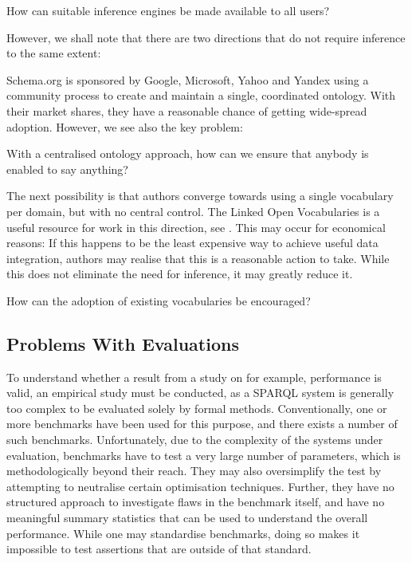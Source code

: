 \begin{problem}%
How can suitable inference engines be made available to all users?
\end{problem}


However, we shall note that there are two directions that do not
require inference to the same extent: 

Schema.org is sponsored by Google, Microsoft, Yahoo and Yandex using a
community process to create and maintain a single, coordinated
ontology. With their market shares, they have a reasonable chance of
getting wide-spread adoption. However, we see also the key problem:

\begin{problem}%
With a centralised ontology approach, how can we ensure that anybody is enabled to say
anything?
\end{problem}

The next possibility is that authors converge towards using a single
vocabulary per domain, but with no central control. The Linked Open
Vocabularies is a useful resource for work in this direction, see
\cite{lov2}. This may occur for economical reasons: If this happens to
be the least expensive way to achieve useful data integration, authors
may realise that this is a reasonable action to take. While this does
not eliminate the need for inference, it may greatly reduce it.

\begin{problem}%
How can the adoption of existing vocabularies be encouraged? 
\end{problem}


\subsection{Problems With Evaluations}\label{sec:evalproblems}

To understand whether a result from a study on for example,
performance is valid, an empirical study must be conducted, as a
SPARQL system is generally too complex to be evaluated solely by
formal methods. Conventionally, one or more benchmarks have been used
for this purpose, and there exists a number of such
benchmarks. Unfortunately, due to the complexity of the systems under
evaluation, benchmarks have to test a very large number of parameters,
which is methodologically beyond their reach. They may also
oversimplify the test by attempting to neutralise certain optimisation
techniques. Further, they have no structured approach to investigate
flaws in the benchmark itself, and have no meaningful summary
statistics that can be used to understand the overall
performance. While one may standardise benchmarks, doing so makes it
impossible to test assertions that are outside of that standard.

